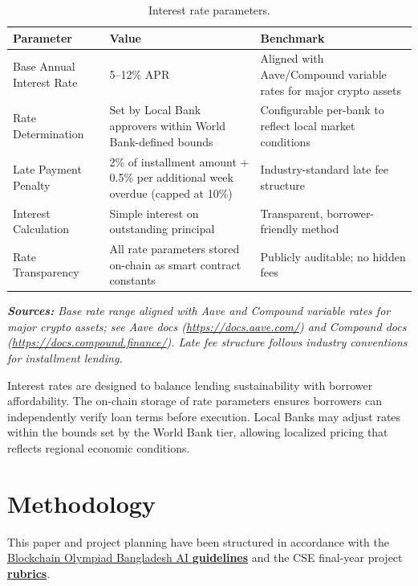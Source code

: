 \documentclass[11pt,a4paper]{article}
\newcommand{\tableheadfont}{\bfseries\small\color{PrimaryBlue}}
\newenvironment{moderntable}[1][H]{%
    \begin{table}[#1]\centering\small%
    \renewcommand{\arraystretch}{1.35}%
}{%
    \end{table}%
}
\begin{document}
\begin{moderntable}
\caption{Interest rate parameters.}
\begin{tabular}{@{} >{\raggedright}p{3.5cm} >{\raggedright}p{3.5cm} >{\raggedright\arraybackslash}p{5cm} @{}}
\toprule
\tableheadfont Parameter & \tableheadfont Value & \tableheadfont Benchmark \\
\midrule
\rowcolor{RowShade}
Base Annual Interest Rate & 5--12\% APR & Aligned with Aave/Compound variable rates for major crypto assets \\
Rate Determination & Set by Local Bank approvers within World Bank-defined bounds & Configurable per-bank to reflect local market conditions \\
\rowcolor{RowShade}
Late Payment Penalty & 2\% of installment amount + 0.5\% per additional week overdue (capped at 10\%) & Industry-standard late fee structure \\
Interest Calculation & Simple interest on outstanding principal & Transparent, borrower-friendly method \\
\rowcolor{RowShade}
Rate Transparency & All rate parameters stored on-chain as smart contract constants & Publicly auditable; no hidden fees \\
\bottomrule
\end{tabular}
\end{moderntable}

\vspace{4pt}
\noindent\textit{\small\textbf{Sources:} Base rate range aligned with Aave and Compound variable rates for major crypto assets; see Aave docs (\url{https://docs.aave.com/}) and Compound docs (\url{https://docs.compound.finance/}). Late fee structure follows industry conventions for installment lending.}

Interest rates are designed to balance lending sustainability with borrower affordability. The on-chain storage of rate parameters ensures borrowers can independently verify loan terms before execution. Local Banks may adjust rates within the bounds set by the World Bank tier, allowing localized pricing that reflects regional economic conditions.

\section{Methodology}

This paper and project planning have been structured in accordance with the \href{https://bcolbd.org/uploads/guideline/BLOCKCHAIN\%20OLYMPIAD\%20BANGLADESH\%20AI\%20Guideline.pdf}{Blockchain Olympiad Bangladesh AI \textbf{guidelines}} and the CSE final-year project \href{https://docs.google.com/spreadsheets/d/1PnvmE6MaldPadO8S5bjHajgxZTfdZEz4/edit?gid=384748274\#gid=384748274}{\textbf{rubrics}}.
\end{document}
